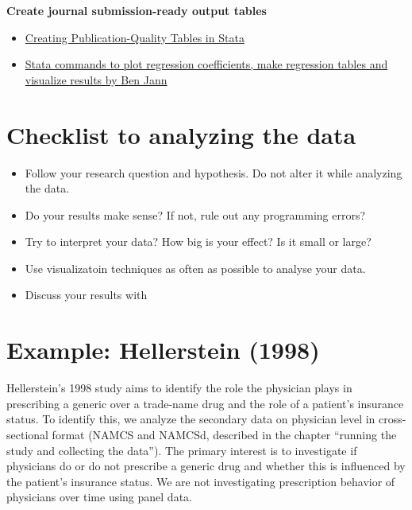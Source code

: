 \documentclass[
]{book}
\providecommand{\tightlist}{%
  \setlength{\itemsep}{0pt}\setlength{\parskip}{0pt}}
\begin{document}
\textbf{Create journal submission-ready output tables}

\begin{itemize}
\tightlist
\item
  \href{https://ssc.wisc.edu/sscc/pubs/stata_tables.htm}{Creating
  Publication-Quality Tables in Stata}
\item
  \href{http://repec.sowi.unibe.ch/stata/}{Stata commands to plot
  regression coefficients, make regression tables and visualize results
  by Ben Jann}
\end{itemize}

\hypertarget{checklist-to-analyzing-the-data}{%
\section{Checklist to analyzing the
data}\label{checklist-to-analyzing-the-data}}

\begin{itemize}
\tightlist
\item
  Follow your research question and hypothesis. Do not alter it while
  analyzing the data.
\item
  Do your results make sense? If not, rule out any programming errors?
\item
  Try to interpret your data? How big is your effect? Is it small or
  large?
\item
  Use visualizatoin techniques as often as possible to analyse your
  data.
\item
  Discuss your results with
\end{itemize}

\hypertarget{example-hellerstein-1998-3}{%
\section{Example: Hellerstein (1998)}\label{example-hellerstein-1998-3}}

Hellerstein's 1998 study aims to identify the role the physician plays
in prescribing a generic over a trade-name drug and the role of a
patient's insurance status. To identify this, we analyze the secondary
data on physician level in cross-sectional format (NAMCS and NAMCSd,
described in the chapter ``running the study and collecting the data'').
The primary interest is to investigate if physicians do or do not
prescribe a generic drug and whether this is influenced by the patient's
insurance status. We are not investigating prescription behavior of
physicians over time using panel data.
\end{document}
